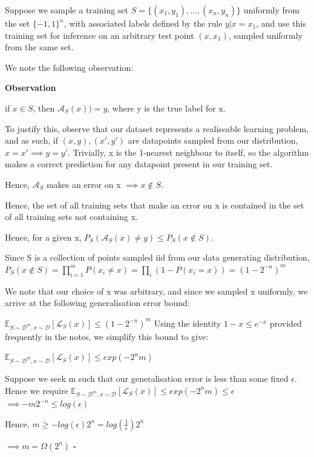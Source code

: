 \documentclass[12pt]{article}
\begin{document}
\begin{itemize}
    Suppose we sample a training set $S = \{(x_{1},y_{1}), \dots, (x_{n},y_{n})\} $ uniformly from the set $\{-1,1\}^{n}$, with associated labels
    defined by the rule $y | x = x_{1}$, and use this training set for inference on an
     arbitrary test point $(x,x_{1})$, sampled uniformly from the same set.
    
    We note the following observation:

    \textbf{Observation}

    if $x \in S$, then $\mathcal{A}_{S}(x)) = y$, where y is the true label for x. 

    To justify this, observe that our dataset represents a realiseable learning problem,
    and as such, if $(x,y), (x \prime,y \prime)$ are datapoints sampled from our distribution,
    $x = x \prime \implies y = y \prime $. Trivially, x is the 1-nearest neighbour to itself,
    so the algorithm makes a correct prediction for any datapoint present in our training set.

    Hence, $\mathcal{A}_{S}$ makes an error on x $\implies x \notin S$.
    
    Hence, the set of all training sets that make an error on x is contained in the set of all
    training sets not containing x. 

    Hence, for a given x, $P_{S}(\mathcal{A}_{S}(x) \ne y) \le P_{S}(x \notin S)$.

    Since S is a collection of points sampled iid from our data generating distribution, 
    $P_{S}(x \notin S) = \prod_{i=1}^{m}P(x_{i} \ne x) = \prod_{i}(1 - P(x_{i} = x)) = (1 - 2^{-n})^{m}$

    We note that our choice of x was arbitrary, and since we sampled x uniformly, we arrive at the 
    following generalisation error bound:

    $\mathbb{E}_{S \sim \mathcal{D}^{m}, x \sim \mathcal{D}}[\mathcal{L}_{S}(x)] \le (1 - 2^{-n})^{m} $
    Using the identity $1-x \le e^{-x}$ provided frequently in the notes, we simplify this bound to give:
    
    

    $\mathbb{E}_{S \sim \mathcal{D}^{m}, x \sim \mathcal{D}}[\mathcal{L}_{S}(x)] \le exp(-2^{n}m)$
    
    Suppose we seek m such that our generalisation error is less than some fixed $\epsilon$. \\
    
    Hence we require $\mathbb{E}_{S \sim \mathcal{D}^{m}, x \sim \mathcal{D}}[\mathcal{L}_{S}(x)] \le exp(-2^{n}m) \le \epsilon$\\
    
    $\implies -m2^{-n} \le log(\epsilon)$

    Hence, $m \ge -log(\epsilon)2^{n} = log(\frac{1}{\epsilon}) 2^{n}$

    $\implies m = \Omega(2^{n})$
    $\square$
\end{itemize}
\end{document}
